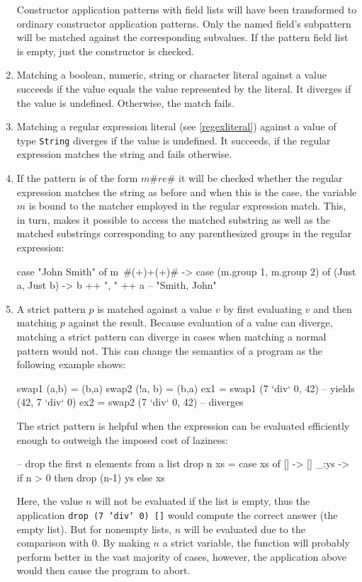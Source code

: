 \begin{enumerate}
Constructor application patterns with field lists will have been transformed to ordinary constructor application patterns. Only the named field's subpattern will be matched against the corresponding subvalues. If the pattern field list is empty, just the constructor is checked.
\item Matching a boolean, numeric, string or character literal against a value succeeds if the value equals the value represented by the literal. It diverges if the value is undefined. Otherwise, the match fails.
\item Matching a regular expression literal (see \autoref{regexliteral}) against a value of type \texttt{String} diverges if the value is undefined. It succeeds, if the regular expression matches the string and fails otherwise.
\item If the pattern is of the form $m$\#$re$\# it will be checked whether the regular expression matches the string as before and when this is the case, the variable $m$ is bound to the matcher employed in the regular expression match. This, in turn, makes it possible to access the matched substring as well as the matched substrings corresponding to any parenthesized groups in the regular expression:
\begin{code}
case "John Smith" of
    m~#(\w+)\s+(\w+)# -> case (m.group 1, m.group 2) of
             (Just a, Just b) -> b ++ ", " ++ a  -- "Smith, John"
\end{code}
\item \label{strictpats} A strict pattern \sym{!}$p$ is matched against a value $v$ by first evaluating $v$ and then matching $p$ against the result. Because evaluation of a value can diverge, matching a strict pattern can diverge in cases  when matching a normal pattern would not. This can change the semantics of a program as the following example shows:
\begin{code}
swap1 (a,b)   = (b,a)
swap2 (!a, b) = (b,a)
ex1 = swap1 (7 `div` 0, 42)   -- yields (42, 7 `div` 0)
ex2 = swap2 (7 `div` 0, 42)   -- diverges
\end{code}

The strict pattern is helpful when the expression can be evaluated efficiently enough to outweigh the imposed cost of laziness:

\begin{code}
-- drop the first n elements from a list
drop n xs = case xs of
    [] -> []
    _:ys -> if n > 0 then drop (n-1) ys else xs
\end{code}

Here, the value $n$ will not be evaluated if the list is empty, thus the application \texttt{drop (7 `div` 0) []} would compute the correct answer (the empty list). But for nonempty lists, $n$ will be evaluated due to the comparison with 0. By making $n$ a strict variable, the function will probably perform better in the vast majority of cases, however, the application above would then cause the program to abort.

\end{enumerate}
